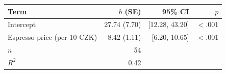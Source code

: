 \begin{tabular}{lrrr}
\toprule
Term & $b$ (SE) & 95\% CI & $p$ \\
\midrule
Intercept & 27.74 (7.70) & [12.28, 43.20] & $<$.001 \\
Espresso price (per 10 CZK) & 8.42 (1.11) & [6.20, 10.65] & $<$.001 \\
$n$ & 54 &  &  \\
$R^2$ & 0.42 &  &  \\
\bottomrule
\end{tabular}
